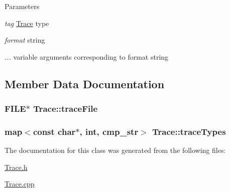 \begin{DoxyParams}{Parameters}
\item[{\em tag}]\hyperlink{classTrace}{Trace} type \item[{\em format}]string \item[{\em ...}]variable arguments corresponding to format string \end{DoxyParams}


\subsection{Member Data Documentation}
\hypertarget{classTrace_add836c59b7ac76f215560d71343b5c62}{
\subsubsection[{traceFile}]{\setlength{\rightskip}{0pt plus 5cm}FILE$\ast$ {\bf Trace::traceFile}}}
\label{classTrace_add836c59b7ac76f215560d71343b5c62}
\hypertarget{classTrace_af65cfa6584d7f34ea3809d727675e729}{
\subsubsection[{traceTypes}]{\setlength{\rightskip}{0pt plus 5cm}map$<$const char$\ast$, int, {\bf cmp\_\-str}$>$ {\bf Trace::traceTypes}}}
\label{classTrace_af65cfa6584d7f34ea3809d727675e729}


The documentation for this class was generated from the following files:\begin{DoxyCompactItemize}
\item 
\hyperlink{Trace_8h}{Trace.h}\item 
\hyperlink{Trace_8cpp}{Trace.cpp}\end{DoxyCompactItemize}

